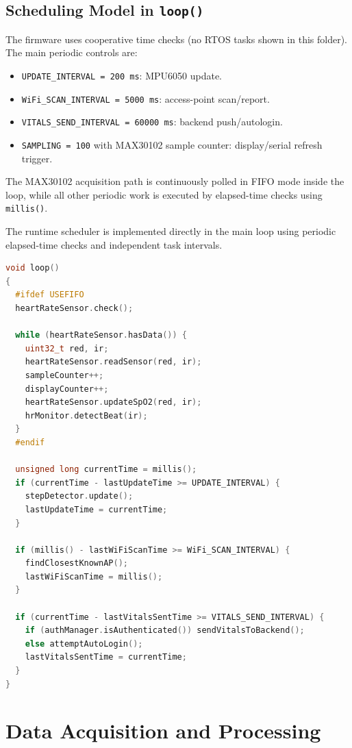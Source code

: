\documentclass[12pt,a4paper]{report}
\begin{document}
\subsection{Scheduling Model in \texttt{loop()}}
The firmware uses cooperative time checks (no RTOS tasks shown in this folder). The main periodic controls are:
\begin{itemize}
  \item \texttt{UPDATE\_INTERVAL = 200 ms}: MPU6050 update.
  \item \texttt{WiFi\_SCAN\_INTERVAL = 5000 ms}: access-point scan/report.
  \item \texttt{VITALS\_SEND\_INTERVAL = 60000 ms}: backend push/autologin.
  \item \texttt{SAMPLING = 100} with MAX30102 sample counter: display/serial refresh trigger.
\end{itemize}

The MAX30102 acquisition path is continuously polled in FIFO mode inside the loop, while all other periodic work is executed by elapsed-time checks using \texttt{millis()}.

The runtime scheduler is implemented directly in the main loop using periodic elapsed-time checks and independent task intervals.
\begin{lstlisting}[style=codestyle, language=C++]
void loop()
{
  #ifdef USEFIFO
  heartRateSensor.check();

  while (heartRateSensor.hasData()) {
    uint32_t red, ir;
    heartRateSensor.readSensor(red, ir);
    sampleCounter++;
    displayCounter++;
    heartRateSensor.updateSpO2(red, ir);
    hrMonitor.detectBeat(ir);
  }
  #endif

  unsigned long currentTime = millis();
  if (currentTime - lastUpdateTime >= UPDATE_INTERVAL) {
    stepDetector.update();
    lastUpdateTime = currentTime;
  }

  if (millis() - lastWiFiScanTime >= WiFi_SCAN_INTERVAL) {
    findClosestKnownAP();
    lastWiFiScanTime = millis();
  }

  if (currentTime - lastVitalsSentTime >= VITALS_SEND_INTERVAL) {
    if (authManager.isAuthenticated()) sendVitalsToBackend();
    else attemptAutoLogin();
    lastVitalsSentTime = currentTime;
  }
}
\end{lstlisting}

\section{Data Acquisition and Processing}
\end{document}

